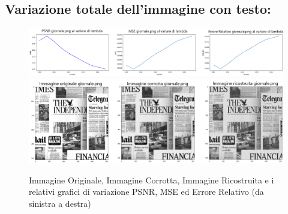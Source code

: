 \subsection{Variazione totale dell'immagine con testo:}
\begin{figure}[H]
    \centering
    \includegraphics[width=\textwidth]{imgRel/graficoGiornale.png}
    \includegraphics[width=\textwidth]{imgRicostruzione/ricostruzioneGiornale_TOTVAR_maxPSNR23.20.png}
    \caption{Immagine Originale, Immagine Corrotta, Immagine Ricostruita e i relativi grafici di variazione PSNR, MSE ed Errore Relativo (da sinistra a destra)}
\end{figure}